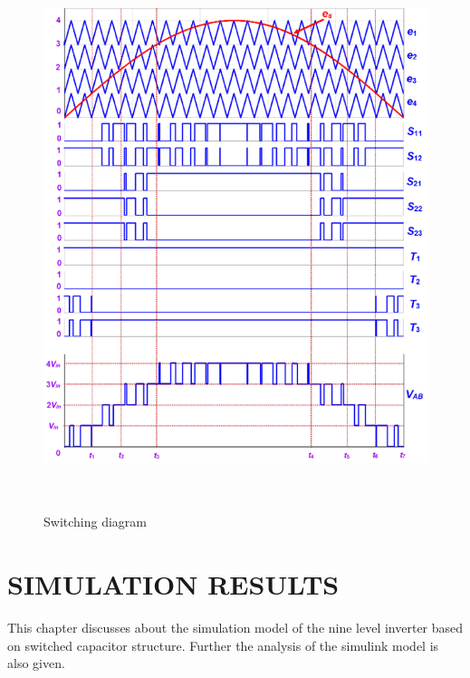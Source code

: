 \documentclass[12pt,a4paper]{report}
\begin{document}
\begin{figure}[H]
	\begin{center}
		\includegraphics[width=15cm,height=16cm]{figures/switching_graph_states}
	\end{center}
	\caption{Switching diagram}
	\label{sc}
\end{figure} 

\clearpage

\chapter{SIMULATION RESULTS}

This chapter discusses about the simulation model of the nine level inverter based on switched capacitor structure. Further the analysis of the simulink model is also given.
\end{document}
